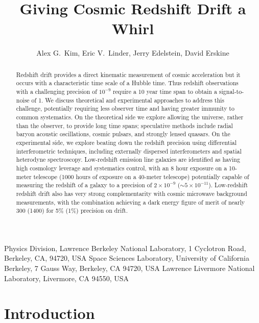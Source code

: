 \documentclass[preprint2, 10pt]{aastex}
\begin{document}
\title{Giving Cosmic Redshift Drift a Whirl} 
\author{Alex G.\ Kim, Eric V.\ Linder, Jerry Edelstein, David Erskine}
{
Physics Division, Lawrence Berkeley National Laboratory, 1 Cyclotron Road, Berkeley, CA, 94720, USA}
{
Space Sciences Laboratory, University of California Berkeley, 7 Gauss Way, Berkeley, CA 94720, USA
}
{
Lawrence Livermore National Laboratory, Livermore,
CA 94550, USA
} 

\begin{abstract} 
Redshift drift provides a direct kinematic measurement of cosmic acceleration 
but it occurs with a characteristic time scale of a Hubble time.  Thus 
redshift observations with a challenging precision of $10^{-9}$ require a 
10 year time span to obtain a signal-to-noise of 1. We discuss theoretical 
and experimental approaches to address this challenge, potentially requiring 
less observer time and having greater immunity to common systematics.  On 
the theoretical side we explore allowing the universe, rather than the 
observer, to provide long time spans; speculative methods include radial 
baryon acoustic oscillations, cosmic pulsars, and strongly lensed quasars. 
On the experimental side, we explore beating down the redshift precision 
using differential interferometric techniques, including externally 
dispersed interferometers and spatial heterodyne spectroscopy. Low-redshift
emission line galaxies are identified as having high cosmology 
leverage and systematics control, with an 8 hour exposure on a 10-meter 
telescope (1000 hours of exposure on a 40-meter telescope) potentially 
capable of measuring the redshift of a galaxy to a precision 
of $2\times 10^{-9}$ 
($\sim5\times 10^{-11}$). Low-redshift redshift drift also has very strong 
complementarity with cosmic microwave background measurements, with the 
combination achieving a dark energy figure of merit of nearly 300 (1400) 
for 5\% (1\%) precision on drift. 
\end{abstract}




\section{Introduction} \label{Sec:intro} 
\end{document}
